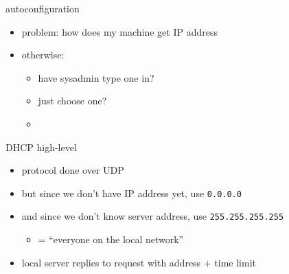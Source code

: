 
\begin{frame}{autoconfiguration}
\begin{itemize}
\item problem: how does my machine get IP address
\vspace{.5cm}
\item otherwise:
    \begin{itemize}
    \item have sysadmin type one in?
    \item just choose one?
    \item {}
    \end{itemize}
\end{itemize}
\end{frame}

\begin{frame}{DHCP high-level}
    \begin{itemize}
    \item protocol done over UDP
    \vspace{.5cm}
    \item but since we don't have IP address yet, use \texttt{0.0.0.0}
    \item and since we don't know server address, use \texttt{255.255.255.255}
        \begin{itemize}
        \item = ``everyone on the local network''
        \end{itemize}
    \item local server replies to request with address + time limit
    \end{itemize}
\end{frame}

